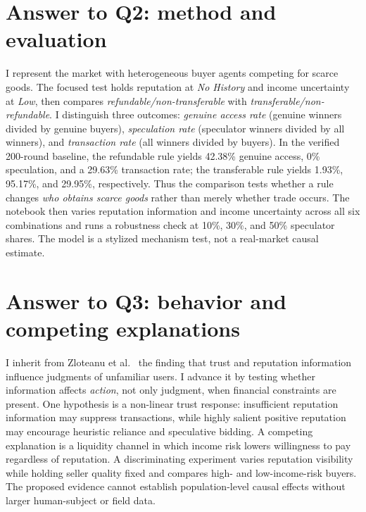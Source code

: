 \section{Answer to Q2: method and evaluation}
I represent the market with heterogeneous buyer agents competing for scarce goods. The focused test holds reputation at \emph{No History} and income uncertainty at \emph{Low}, then compares \emph{refundable/non-transferable} with \emph{transferable/non-refundable}. I distinguish three outcomes: \emph{genuine access rate} (genuine winners divided by genuine buyers), \emph{speculation rate} (speculator winners divided by all winners), and \emph{transaction rate} (all winners divided by buyers). In the verified 200-round baseline, the refundable rule yields 42.38\% genuine access, 0\% speculation, and a 29.63\% transaction rate; the transferable rule yields 1.93\%, 95.17\%, and 29.95\%, respectively. Thus the comparison tests whether a rule changes \emph{who obtains scarce goods} rather than merely whether trade occurs. The notebook then varies reputation information and income uncertainty across all six combinations and runs a robustness check at 10\%, 30\%, and 50\% speculator shares. The model is a stylized mechanism test, not a real-market causal estimate.

\section{Answer to Q3: behavior and competing explanations}
I inherit from Zloteanu et al.~\cite{zloteanu2018} the finding that trust and reputation information influence judgments of unfamiliar users. I advance it by testing whether information affects \emph{action}, not only judgment, when financial constraints are present. One hypothesis is a non-linear trust response: insufficient reputation information may suppress transactions, while highly salient positive reputation may encourage heuristic reliance and speculative bidding. A competing explanation is a liquidity channel in which income risk lowers willingness to pay regardless of reputation. A discriminating experiment varies reputation visibility while holding seller quality fixed and compares high- and low-income-risk buyers. The proposed evidence cannot establish population-level causal effects without larger human-subject or field data.

